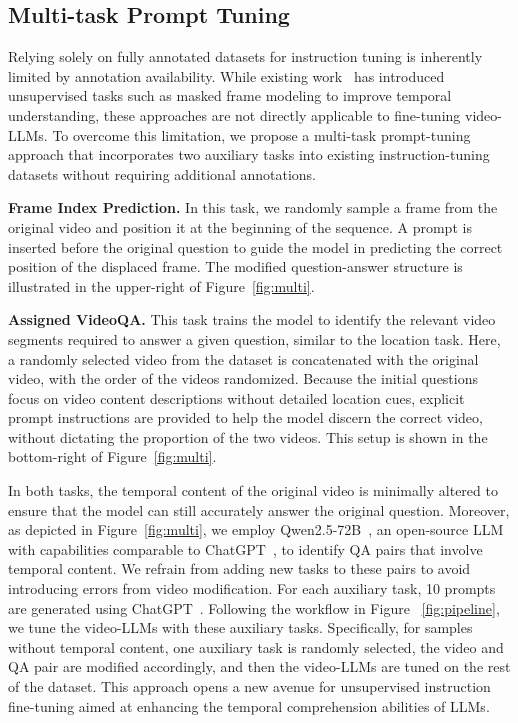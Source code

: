 \subsection{Multi-task Prompt Tuning}
Relying solely on fully annotated datasets for instruction tuning is inherently limited by annotation availability. While existing work~\cite{Lei2021Understanding,Wang2023All,Sun2022Long} has introduced unsupervised tasks such as masked frame modeling to improve temporal understanding, these approaches are not directly applicable to fine-tuning video-LLMs. To overcome this limitation, we propose a multi-task prompt-tuning approach that incorporates two auxiliary tasks into existing instruction-tuning datasets without requiring additional annotations.

\noindent\textbf{Frame Index Prediction.} In this task, we randomly sample a frame from the original video and position it at the beginning of the sequence. A prompt is inserted before the original question to guide the model in predicting the correct position of the displaced frame.  The modified question-answer structure is illustrated in the upper-right of Figure~\ref{fig:multi}.


\noindent\textbf{Assigned VideoQA.} This task trains the model to identify the relevant video segments required to answer a given question, similar to the location task. Here, a randomly selected video from the dataset is concatenated with the original video, with the order of the videos randomized. Because the initial questions focus on video content descriptions without detailed location cues, explicit prompt instructions are provided to help the model discern the correct video, without dictating the proportion of the two videos. This setup is shown in the bottom-right of Figure~\ref{fig:multi}.

In both tasks, the temporal content of the original video is minimally altered to ensure that the model can still accurately answer the original question.  Moreover, as depicted in Figure~\ref{fig:multi}, we employ Qwen2.5-72B~\cite{qwen2.5}, an open-source LLM with capabilities comparable to ChatGPT~\cite{OpenAI2024GPT-4}, to identify QA pairs that involve temporal content. We refrain from adding new tasks to these pairs to avoid introducing errors from video modification. For each auxiliary task, 10 prompts are generated using ChatGPT~\cite{OpenAI2024GPT-4}. Following the workflow in Figure ~\ref{fig:pipeline}, we tune the video-LLMs with these auxiliary tasks. Specifically, for samples without temporal content, one auxiliary task is randomly selected, the video and QA pair are modified accordingly, and then the video-LLMs are tuned on the rest of the dataset. This approach opens a new avenue for unsupervised instruction fine-tuning aimed at enhancing the temporal comprehension abilities of LLMs. 



